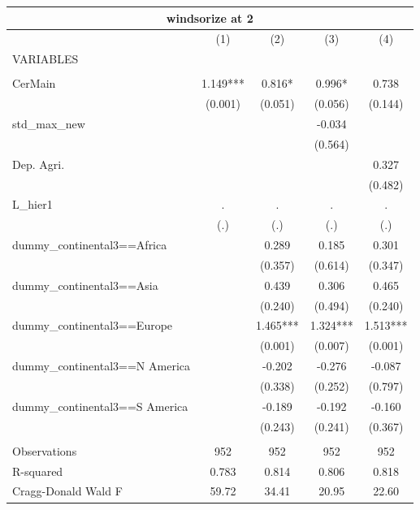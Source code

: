 \begin{tabular}{lcccc}
\multicolumn{5}{c}{windsorize at 2} \\ \hline
 & (1) & (2) & (3) & (4) \\
VARIABLES &  &  &  &  \\ \hline
 &  &  &  &  \\
CerMain & 1.149*** & 0.816* & 0.996* & 0.738 \\
 & (0.001) & (0.051) & (0.056) & (0.144) \\
std\_max\_new &  &  & -0.034 &  \\
 &  &  & (0.564) &  \\
Dep. Agri. &  &  &  & 0.327 \\
 &  &  &  & (0.482) \\
L\_hier1 & . & . & . & . \\
 & (.) & (.) & (.) & (.) \\
dummy\_continental3==Africa &  & 0.289 & 0.185 & 0.301 \\
 &  & (0.357) & (0.614) & (0.347) \\
dummy\_continental3==Asia &  & 0.439 & 0.306 & 0.465 \\
 &  & (0.240) & (0.494) & (0.240) \\
dummy\_continental3==Europe &  & 1.465*** & 1.324*** & 1.513*** \\
 &  & (0.001) & (0.007) & (0.001) \\
dummy\_continental3==N America &  & -0.202 & -0.276 & -0.087 \\
 &  & (0.338) & (0.252) & (0.797) \\
dummy\_continental3==S America &  & -0.189 & -0.192 & -0.160 \\
 &  & (0.243) & (0.241) & (0.367) \\
 &  &  &  &  \\
Observations & 952 & 952 & 952 & 952 \\
R-squared & 0.783 & 0.814 & 0.806 & 0.818 \\
 Cragg-Donald Wald F & 59.72 & 34.41 & 20.95 & 22.60 \\ \hline
\end{tabular}
